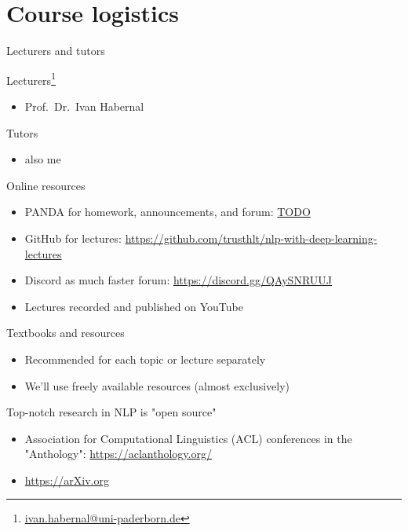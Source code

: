 \documentclass[12pt,aspectratio=169,handout]{beamer}
\begin{document}
\section{Course logistics}


\begin{frame}{Lecturers and tutors}

Lecturers\footnote{\url{ivan.habernal@uni-paderborn.de}}

\begin{itemize}
	\item Prof.\ Dr.\ Ivan Habernal
\end{itemize}

Tutors

\begin{itemize}
	\item also me
\end{itemize}

\end{frame}



\begin{frame}{Online resources}
	
\begin{itemize}
	\item PANDA for homework, announcements, and forum: \url{TODO}
	\item GitHub for lectures: \url{https://github.com/trusthlt/nlp-with-deep-learning-lectures}
	\item Discord as much faster forum: \url{https://discord.gg/QAySNRUUJ}
	\item Lectures recorded and published on YouTube
\end{itemize}
	
\end{frame}

\begin{frame}{Textbooks and resources}
	
\begin{itemize}
	\item Recommended for each topic or lecture separately
	\item We'll use freely available resources (almost exclusively)
\end{itemize}

Top-notch research in NLP is "open source"

\begin{itemize}
	\item Association for Computational Linguistics (ACL) conferences in the "Anthology": \url{https://aclanthology.org/}
	\item \url{https://arXiv.org}
\end{itemize}
	
\end{frame}
\end{document}
